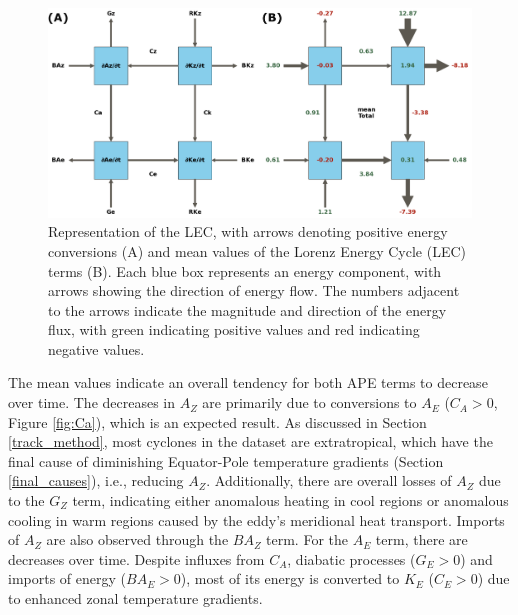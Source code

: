\begin{figure}[!htbp]
\centering
\includegraphics[width=\textwidth]{figs_5/lec_mean_values.pdf}
\caption[LEC - Mean Life Cycle]{Representation of the LEC, with arrows denoting positive energy conversions (A) and mean values of the Lorenz Energy Cycle (LEC) terms (B). Each blue box represents an energy component, with arrows showing the direction of energy flow. The numbers adjacent to the arrows indicate the magnitude and direction of the energy flux, with green indicating positive values and red indicating negative values.}
\label{fig:lec_mean_values}
\end{figure}

The mean values indicate an overall tendency for both APE terms to decrease over time. The decreases in $A_Z$ are primarily due to conversions to $A_E$ ($C_A > 0$, Figure \ref{fig:Ca}), which is an expected result. As discussed in Section \ref{track_method}, most cyclones in the dataset are extratropical, which have the final cause of diminishing Equator-Pole temperature gradients (Section \ref{final_causes}), i.e., reducing $A_Z$. Additionally, there are overall losses of $A_Z$ due to the $G_Z$ term, indicating either anomalous heating in cool regions or anomalous cooling in warm regions caused by the eddy's meridional heat transport. Imports of $A_Z$ are also observed through the $BA_Z$ term. For the $A_E$ term, there are decreases over time. Despite influxes from $C_A$, diabatic processes ($G_E > 0$) and imports of energy ($BA_E > 0$), most of its energy is converted to $K_E$ ($C_E > 0$) due to enhanced zonal temperature gradients.

